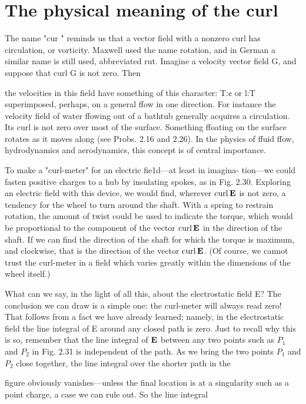 {\section{The physical meaning of the curl}

The name "cur " reminds us that a vector field with a nonzero curl
has circulation, or vorticity. Maxwell used the name rotation, and
in German a similar name is still used, abbreviated rut. Imagine
a velocity vector field G, and suppose that curl G is not zero. Then

the velocities in this field have something of this character: T:¢ or
l:T superimposed, perhaps, on a general ffow in one direction. For
instance the velocity field of water ffowing out of a bathtub generally
acquires a circulation. Its curl is not zero over most of the surface.
Something ffoating on the surface rotates as it moves along (see
Probs. 2.16 and 2.26). In the physics of ffuid ffow, hydrodynamics
and aerodynamics, this concept is of central importance.

To make a "curl-meter" for an electric fie1d---at least in imagina-
tion---we could fasten positive charges to a hub by insulating spokes,
as in Fig. 2.30. Exploring an electric field with this device, we would
find, wherever $\operatorname{curl}\mathbf{E}$ is not zero, a tendency for the wheel to turn
around the shaft. With a spring to restrain rotation, the amount of
twist could be used to indicate the torque, which would be proportional
to the component of the vector $\operatorname{curl}\mathbf{E}$ in the direction of the
shaft. If we can find the direction of the shaft for which the torque
is maximum, and clockwise, that is the direction of the vector $\operatorname{curl}\mathbf{E}$.
(Of course, we cannot trust the curl-meter in a field which varies
greatly within the dimensions of the wheel itself.)

What can we say, in the light of all this, about the electrostatic
field E? The conclusion we can draw is a simple one: the curl-meter
will always read zero! That follows from a fact we have already
learned; namely, in the electrostatic field the line integral of E
around any closed path is zero. Just to recall why this is so, remember
that the line integral of $\mathbf{E}$ between any two points such as $P_1$ and
$P_2$ in Fig. 2.31 is independent of the path. As we bring the two points
$P_1$ and $P_2$ close together, the line integral over the shorter path in the

figure obviously vanishes---unless the final location is at a singularity
such as a point charge, a case we can rule out. So the line integral

}
